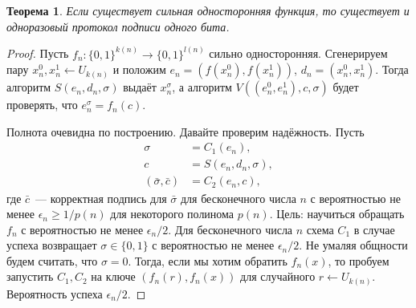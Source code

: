 \documentclass[12pt,a4paper]{article}
\newcommand{\bits}{\{0,1\}}
\theoremstyle{definition}
\theoremstyle{plain}
\newtheorem{theorem}{Теорема}[section]
\theoremstyle{remark}
\begin{document}
\begin{theorem}
Если существует сильная односторонняя функция, то существует
и одноразовый протокол подписи одного бита.
\end{theorem}
\begin{proof}
Пусть $f_n:\bits^{k(n)}\to\bits^{l(n)}$ сильно односторонняя.
Сгенерируем пару $x^0_n,x^1_n\gets U_{k(n)}$ и положим $e_n = (f(x^0_n), f(x^1_n))$, $d_n=(x^0_n,x^1_n)$. Тогда алгоритм $S(e_n,d_n, \sigma)$ выдаёт $x^\sigma_n$, а
алгоритм $V((e^0_n, e^1_n), c, \sigma)$ будет проверять, 
что $e^\sigma_n = f_n(c)$.

Полнота очевидна по построению. Давайте проверим надёжность.
Пусть 
$$
\begin{aligned}
\sigma &= C_1(e_n),\\
c &= S(e_n, d_n, \sigma),\\
(\bar \sigma, \bar c) &= C_2(e_n,c),
\end{aligned}
$$
где $\bar c$~--- корректная подпись для 
$\bar\sigma$ для бесконечного числа $n$ с вероятностью
не менее $\epsilon_n\ge 1/p(n)$ для некоторого полинома $p(n)$. Цель: научиться обращать $f_n$ с вероятностью
не менее $\epsilon_n/2$. Для бесконечного числа $n$ схема
$C_1$ в случае успеха возвращает $\sigma\in\bits$ с вероятностью
не менее $\epsilon_n/2$. Не умаляя общности будем считать,
что $\sigma = 0$. Тогда, если мы хотим обратить $f_n(x)$,
то пробуем запустить $C_1,C_2$ на ключе $(f_n(r),f_n(x))$ 
для случайного $r\gets U_{k(n)}$. Вероятность успеха $\epsilon_n/2$.
\end{proof}
\end{document}
